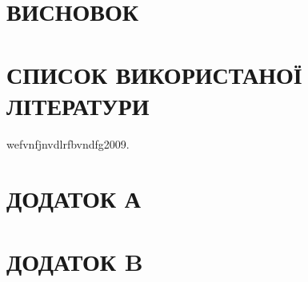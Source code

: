 \documentclass[a4paper,14pt]{extreport}
\begin{document}
\newpage
\chapter{ВИСНОВОК}

\newpage
\chapter{СПИСОК ВИКОРИСТАНОЇ ЛІТЕРАТУРИ }
	\begin{thebibliography}{9}
		 wefvnfjnvdlrfbvndfg2009.
	\end{thebibliography}

\newpage
\chapter{ДОДАТОК А }

\newpage
\chapter{ДОДАТОК B }
\end{document}
